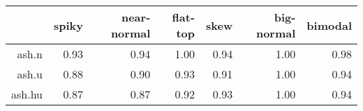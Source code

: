 \begin{tabular}{rrrrrrr}
  \toprule  & spiky & near-normal & flat-top & skew & big-normal & bimodal \\ 
  \midrule ash.n & 0.93 & 0.94 & 1.00 & 0.94 & 1.00 & 0.98 \\ 
  ash.u & 0.88 & 0.90 & 0.93 & 0.91 & 1.00 & 0.94 \\ 
  ash.hu & 0.87 & 0.87 & 0.92 & 0.93 & 1.00 & 0.94 \\ 
   \bottomrule \end{tabular}

